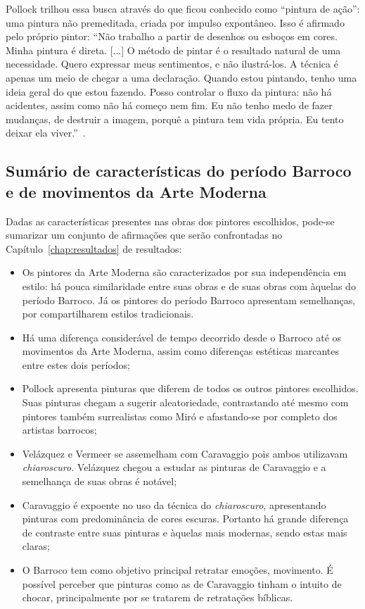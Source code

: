 Pollock trilhou essa busca
através do que ficou conhecido como ``pintura de ação'': uma pintura
não premeditada, criada por impulso expontâneo. Isso é afirmado pelo
próprio pintor: ``Não trabalho a partir de desenhos ou esboços em
cores. Minha pintura é direta. [...] O método de pintar é o resultado
natural de uma necessidade. Quero expressar meus sentimentos, e não
ilustrá-los. A técnica é apenas um meio de chegar a uma
declaração. Quando estou pintando, tenho uma ideia geral do que estou
fazendo. Posso controlar o fluxo da pintura: não há acidentes, assim
como não há começo nem fim. Eu não tenho medo de fazer mudanças, de
destruir a imagem, porquê a pintura tem vida própria. Eu tento deixar
ela viver.''~\cite{pollock}.

\subsection{Sumário de características do período Barroco e de movimentos da Arte Moderna}
\label{subsec:sumario}

Dadas as características presentes nas obras dos pintores escolhidos,
pode-se sumarizar um conjunto de afirmações que serão
confrontadas no Capítulo~\ref{chap:resultados} de resultados:

\begin{itemize}
\item Os pintores da Arte Moderna são caracterizados por sua
  independência em estilo: há pouca similaridade entre suas obras e de
  suas obras com àquelas do período Barroco. Já os pintores do período
  Barroco apresentam semelhanças, por compartilharem estilos
  tradicionais.

\item Há uma diferença considerável de tempo decorrido desde o Barroco
  até os movimentos da Arte Moderna, assim como diferenças estéticas
  marcantes entre estes dois períodos;

\item Pollock apresenta pinturas que diferem de todos os outros
  pintores escolhidos. Suas pinturas chegam a sugerir aleatoriedade,
  contrastando até mesmo com pintores também surrealistas como Miró e
  afastando-se por completo dos artistas barrocos;

\item Velázquez e Vermeer se assemelham com Caravaggio pois ambos
  utilizavam \textit{chiaroscuro}. Velázquez chegou a estudar as
  pinturas de Caravaggio e a semelhança de suas obras é notável;

\item Caravaggio é expoente no uso da técnica do
  \textit{chiaroscuro}, apresentando pinturas com predominância de
  cores escuras. Portanto há grande diferença de contraste entre suas
  pinturas e àquelas mais modernas, sendo estas mais claras;

\item O Barroco tem como objetivo principal retratar emoções,
  movimento. É possível perceber que pinturas como as de Caravaggio
  tinham o intuito de chocar, principalmente por se tratarem de
  retratações bíblicas.
\end{itemize}

